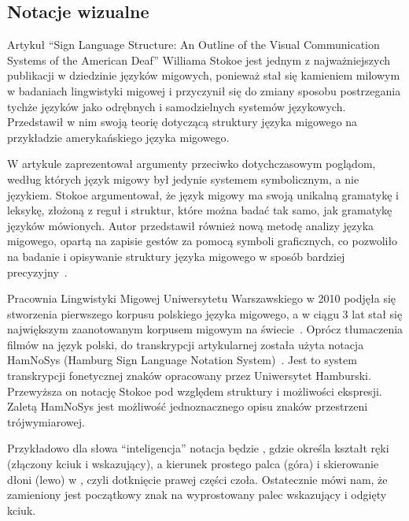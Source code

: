 \subsection{Notacje wizualne}
\label{subsec:visual-notation}

Artykuł \enquote{Sign Language Structure: An Outline of the Visual Communication Systems of the American Deaf} Williama Stokoe jest jednym z najważniejszych publikacji w dziedzinie języków migowych, ponieważ stał się kamieniem milowym w badaniach lingwistyki migowej i przyczynił się do zmiany sposobu postrzegania tychże języków jako odrębnych i samodzielnych systemów językowych. Przedstawił w nim swoją teorię dotyczącą struktury języka migowego na przykładzie amerykańskiego języka migowego.

W artykule zaprezentował argumenty przeciwko dotychczasowym poglądom, według których język migowy był jedynie systemem symbolicznym, a nie językiem. Stokoe argumentował, że język migowy ma swoją unikalną gramatykę i leksykę, złożoną z reguł i struktur, które można badać tak samo, jak gramatykę języków mówionych. Autor przedstawił również nową metodę analizy języka migowego, opartą na zapisie gestów za pomocą symboli graficznych, co pozwoliło na badanie i opisywanie struktury języka migowego w sposób bardziej precyzyjny~\cite{stokoe2005}.

Pracownia Lingwistyki Migowej Uniwersytetu Warszawskiego w 2010 podjęła się stworzenia pierwszego korpusu polskiego języka migowego, a w ciągu 3 lat stał się największym zaanotowanym korpusem migowym na świecie~\cite{rutkowski2013}. Oprócz tłumaczenia filmów na język polski, do transkrypcji artykularnej została użyta notacja HamNoSys (Hamburg Sign Language Notation System)~\cite{hanke2004}. Jest to system transkrypcji fonetycznej znaków opracowany przez Uniwersytet Hamburski. Przewyższa on notację Stokoe pod względem struktury i możliwości ekspresji. Zaletą HamNoSys jest możliwość jednoznacznego opisu znaków przestrzeni trójwymiarowej.

Przykładowo dla słowa \enquote{inteligencja} notacja będzie \hampinchonetwo\hamextfingeru\hampalml\hamforehead\hamlrat\hamtouch\hamreplace\hamfingertwo\hamthumbopenmod, gdzie \hampinchonetwo\hamspace określa kształt ręki (złączony kciuk i wskazujący), a \hamextfingeru\hamspace kierunek prostego palca (góra) i \hampalml\hamspace skierowanie dłoni (lewo) w \hamforehead\hamlrat\hamtouch, czyli dotknięcie prawej części czoła. Ostatecznie \hamreplace\hamfingertwo\hamthumbopenmod\hamspace mówi nam, że zamieniony jest początkowy znak na wyprostowany palec wskazujący i odgięty kciuk.

